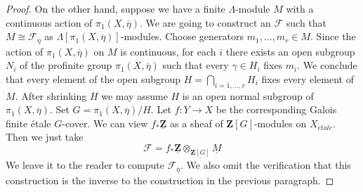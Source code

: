 \documentclass[10pt,a4paper]{amsart}
\theoremstyle{plain}
\theoremstyle{definition}
\theoremstyle{remark}
\numberwithin{equation}{subsection}
\def\etale{{\acute{e}tale}}
\begin{document}
\begin{proof}
\medskip\noindent
On the other hand, suppose we have a finite $\Lambda$-module $M$
with a continuous action of $\pi_1(X, \overline{\eta})$.
We are going to construct an $\mathcal{F}$ such that
$M \cong \mathcal{F}_{\overline{\eta}}$ as
$\Lambda[\pi_1(X, \overline{\eta})]$-modules.
Choose generators $m_1, \ldots, m_r \in M$.
Since the action of $\pi_1(X, \overline{\eta})$ on $M$ is
continuous, for each $i$ there exists an open subgroup
$N_i$ of the profinite group $\pi_1(X, \overline{\eta})$
such that every $\gamma \in H_i$ fixes $m_i$. We conclude that
every element of the open subgroup $H = \bigcap_{i = 1, \ldots, r} H_i$
fixes every element of $M$. After shrinking $H$ we may assume $H$
is an open normal subgroup of $\pi_1(X, \overline{\eta})$.
Set $G = \pi_1(X, \overline{\eta})/H$. Let $f : Y \to X$ be the
corresponding Galois finite \'etale $G$-cover.
We can view $f_*\underline{\mathbf{Z}}$ as a sheaf of
$\mathbf{Z}[G]$-modules on $X_\etale$. Then we just take
$$
\mathcal{F} =
f_*\underline{\mathbf{Z}} \otimes_{\underline{\mathbf{Z}[G]}} \underline{M}
$$
We leave it to the reader to compute
$\mathcal{F}_{\overline{\eta}}$.
We also omit the verification that this construction
is the inverse to the construction in the previous paragraph.
\end{proof}
\end{document}
